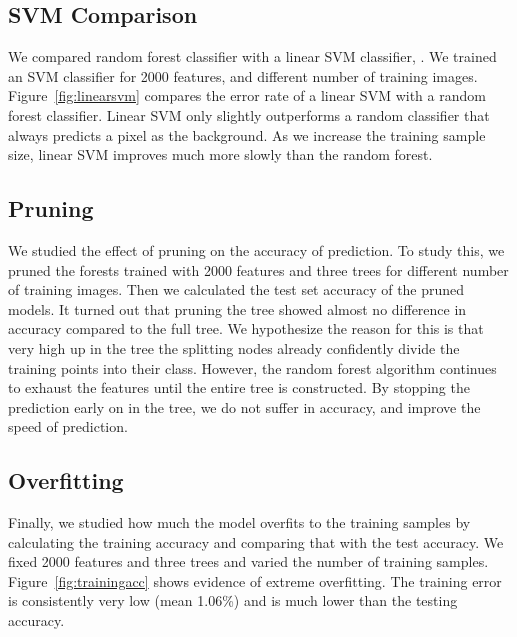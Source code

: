 \subsection{ SVM Comparison}
We compared random forest classifier with a linear SVM classifier, \cite{liblinear}. We trained an SVM classifier for 2000 features, and different number of training images. 
Figure~\ref{fig:linearsvm} compares the error rate of a linear SVM with a random forest classifier. Linear SVM only slightly outperforms a random classifier that always predicts a pixel as the background. As we increase the training sample size, linear SVM improves much more slowly than the random forest.

\subsection{Pruning}
We studied the effect of pruning on the accuracy of prediction. To study this, we pruned the forests trained with 2000 features and three trees for different number of training images. Then we calculated the test set accuracy of the pruned models. It turned out that pruning the tree showed almost no difference in accuracy compared to the full tree. We hypothesize the reason for this is that very high up in the tree the splitting nodes already confidently divide the training points into their class. However, the random forest algorithm continues to exhaust the features until the entire tree is constructed. By stopping the prediction early on in the tree, we do not suffer in accuracy, and improve the speed of prediction.


\subsection{Overfitting}
Finally, we studied how much the model overfits to the training samples by calculating the training accuracy and comparing that with the test accuracy. We fixed 2000 features and three trees and varied the number of training samples. Figure~\ref{fig:trainingacc} shows evidence of extreme overfitting. The training error is consistently very low (mean 1.06\%) and is much lower than the testing accuracy. 

